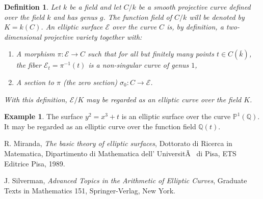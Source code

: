 \documentclass[12pt]{article}
\newtheorem{defn}{Definition}
\theoremstyle{definition}
\newtheorem{exa}{Example}
\newcommand{\Rats}{\mathbb{Q}}
\newcommand{\E}{\mathcal{E}}
\begin{document}
\begin{defn}Let $k$ be a
field and let $C/k$ be a smooth projective curve defined over the
field $k$ and has genus $g$. The function field of $C/k$ will be
denoted by $K=k(C)$. An elliptic surface $\E$ over the curve $C$
is, by definition, a two-dimensional projective variety together
with:

\begin{enumerate}
\item A morphism $\pi: \E \to C$ such that for all but
finitely many points $t\in C(\overline{k})$, the fiber
$\E_t=\pi^{-1}(t)$ is a non-singular curve of genus $1$,
\item A section to $\pi$ (the {\it zero section}) $\sigma_0: C \to
\E$.
\end{enumerate}
With this definition, $\E/K$ may be regarded as an elliptic curve over the
field $K$.
\end{defn}

\begin{exa}
The surface $y^2=x^3+t$ is an elliptic surface over the curve $\mathbb{P}^1(\Rats)$. It may be regarded as an elliptic curve over the function field $\Rats(t)$.
\end{exa}

\begin{thebibliography}{00}

 R. Miranda, {\em The basic theory of elliptic surfaces},
Dottorato di Ricerca in Matematica, Dipartimento di Mathematica dell' UniversitÃ  di Pisa, ETS Editrice Pisa, 1989.

 J. Silverman, {\em Advanced Topics in the
Arithmetic of Elliptic Curves}, Graduate Texts in Mathematics 151,
Springer-Verlag, New York.

\end{thebibliography}
\end{document}
